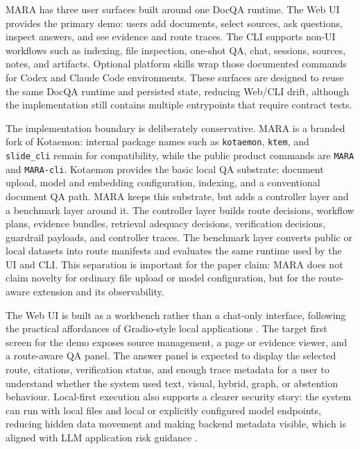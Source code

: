 MARA has three user surfaces built around one DocQA runtime. The Web UI provides the primary demo: users add documents, select sources, ask questions, inspect answers, and see evidence and route traces. The CLI supports non-UI workflows such as indexing, file inspection, one-shot QA, chat, sessions, sources, notes, and artifacts. Optional platform skills wrap those documented commands for Codex and Claude Code environments. These surfaces are designed to reuse the same DocQA runtime and persisted state, reducing Web/CLI drift, although the implementation still contains multiple entrypoints that require contract tests.

The implementation boundary is deliberately conservative. MARA is a branded fork of Kotaemon: internal package names such as \texttt{kotaemon}, \texttt{ktem}, and \texttt{slide\_cli} remain for compatibility, while the public product commands are \texttt{MARA} and \texttt{MARA-cli}. Kotaemon provides the basic local QA substrate: document upload, model and embedding configuration, indexing, and a conventional document QA path. MARA keeps this substrate, but adds a controller layer and a benchmark layer around it. The controller layer builds route decisions, workflow plans, evidence bundles, retrieval adequacy decisions, verification decisions, guardrail payloads, and controller traces. The benchmark layer converts public or local datasets into route manifests and evaluates the same runtime used by the UI and CLI. This separation is important for the paper claim: MARA does not claim novelty for ordinary file upload or model configuration, but for the route-aware extension and its observability.

The Web UI is built as a workbench rather than a chat-only interface, following the practical affordances of Gradio-style local applications \citep{gradio}. The target first screen for the demo exposes source management, a page or evidence viewer, and a route-aware QA panel. The answer panel is expected to display the selected route, citations, verification status, and enough trace metadata for a user to understand whether the system used text, visual, hybrid, graph, or abstention behaviour. Local-first execution also supports a clearer security story: the system can run with local files and local or explicitly configured model endpoints, reducing hidden data movement and making backend metadata visible, which is aligned with LLM application risk guidance \citep{owaspLLM}.

